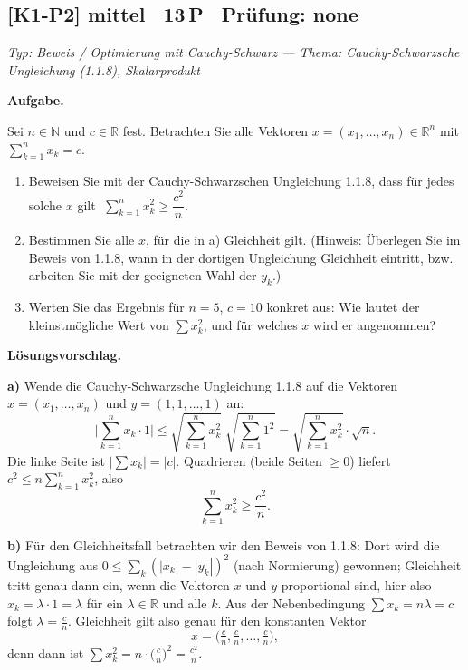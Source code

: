 \documentclass[a4paper,11pt]{article}
\begin{document}
\subsection*{[K1-P2] \normalfont mittel \textbullet\ 13\,P \textbullet\ Pr\"ufung: none}
\textit{Typ: Beweis / Optimierung mit Cauchy-Schwarz  ---  Thema: Cauchy-Schwarzsche Ungleichung (1.1.8), Skalarprodukt}\par\smallskip
\textbf{Aufgabe.}\par
Sei $n\in\mathbb{N}$ und $c\in\mathbb{R}$ fest. Betrachten Sie alle Vektoren $x=(x_1,\dots,x_n)\in\mathbb{R}^n$ mit $\sum_{k=1}^n x_k = c$.
\begin{enumerate}[label=\alph*)]
\item Beweisen Sie mit der Cauchy-Schwarzschen Ungleichung 1.1.8, dass für jedes solche $x$ gilt $\;\sum_{k=1}^n x_k^2 \ge \dfrac{c^2}{n}.$
\item Bestimmen Sie alle $x$, für die in a) Gleichheit gilt. (Hinweis: Überlegen Sie im Beweis von 1.1.8, wann in der dortigen Ungleichung Gleichheit eintritt, bzw. arbeiten Sie mit der geeigneten Wahl der $y_k$.)
\item Werten Sie das Ergebnis für $n=5$, $c=10$ konkret aus: Wie lautet der kleinstmögliche Wert von $\sum x_k^2$, und für welches $x$ wird er angenommen?
\end{enumerate}\par\smallskip
\textbf{L\"osungsvorschlag.}\par
\textbf{a)} Wende die Cauchy-Schwarzsche Ungleichung 1.1.8 auf die Vektoren $x=(x_1,\dots,x_n)$ und $y=(1,1,\dots,1)$ an:
\[ \Big|\sum_{k=1}^n x_k\cdot 1\Big| \le \sqrt{\sum_{k=1}^n x_k^2}\;\sqrt{\sum_{k=1}^n 1^2}=\sqrt{\sum_{k=1}^n x_k^2}\cdot\sqrt{n}. \]
Die linke Seite ist $\big|\sum x_k\big|=|c|$. Quadrieren (beide Seiten $\ge0$) liefert $c^2\le n\sum_{k=1}^n x_k^2$, also
\[ \sum_{k=1}^n x_k^2 \ge \frac{c^2}{n}. \]

\textbf{b)} Für den Gleichheitsfall betrachten wir den Beweis von 1.1.8: Dort wird die Ungleichung aus $0\le \sum_{k}(|x_k|-|y_k|)^2$ (nach Normierung) gewonnen; Gleichheit tritt genau dann ein, wenn die Vektoren $x$ und $y$ proportional sind, hier also $x_k=\lambda\cdot 1=\lambda$ für ein $\lambda\in\mathbb{R}$ und alle $k$. Aus der Nebenbedingung $\sum x_k = n\lambda = c$ folgt $\lambda=\tfrac{c}{n}$. Gleichheit gilt also genau für den konstanten Vektor
\[ x=\Big(\tfrac{c}{n},\tfrac{c}{n},\dots,\tfrac{c}{n}\Big), \]
denn dann ist $\sum x_k^2 = n\cdot\big(\tfrac{c}{n}\big)^2=\tfrac{c^2}{n}$.
\end{document}
